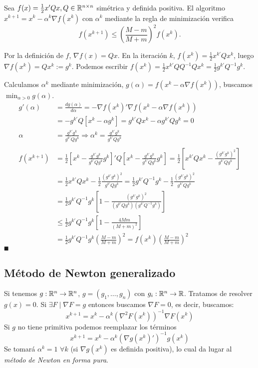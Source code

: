 \documentclass[MIOP.tex]{subfiles}
\begin{document}
\begin{teorema}
Sea $f(x)=\frac{1}{2}x'Qx, Q\in\mathbb{R}^{n\times n}$ simétrica y definida positiva. El algoritmo $x^{k+1}=x^k-\alpha^k\nabla f(x^k)$ con $\alpha^k$ mediante la regla de minimización verifica
$$f(x^{k+1})\leq \left(\frac{M-m}{M+m}\right)^2f(x^k).$$
\end{teorema}
\begin{dem}
Por la definición de $f$, $\nabla f(x)=Qx$. En la iteración $k$, $f(x^k)=\frac{1}{2}x^{k'}Qx^k$, luego $\nabla f(x^k)=Qx^k:=g^k$. Podemos escribir $f(x^k)=\frac{1}{2}x^{k'}QQ^{-1}Qx^k=\frac{1}{2}g^{k'}Q^{-1}g^k$. 

Calculamos $\alpha^k$ mediante minimización, $g(\alpha)=f(x^k-\alpha\nabla f(x^k))$, buscamos $\min_{\alpha>0}g(\alpha)$. 
\begin{align*}
g'(\alpha)&=\frac{dg(\alpha)}{d\alpha}=-\nabla f(x^k)'\nabla f(x^k-\alpha\nabla f(x^k))\\
&=-g^{k'}Q[x^k-\alpha g^k]=g^{k'}Qx^k-\alpha g^{k'}Qg^k=0\\
\alpha&=\frac{g^{k'}g^k}{g^{k'}Qg^k}\Rightarrow \alpha^k=\frac{g^{k'}g^k}{g^{k'}Qg^k}
\\ \\
f(x^{k+1})&=\frac{1}{2}\left[x^k-\frac{g^{k'}g^k}{g^{k'}Qg^k}g^k\right]'Q\left[x^k-\frac{g^{k'}g^k}{g^{k'}Qg^k}g^k\right]=\frac{1}{2}\left[x^{k'}Qx^k-\frac{(g^{k'}g^k)^2}{g^{k'}Qg^k}\right]\\
&=\frac{1}{2}x^{k'}Qx^k-\frac{1}{2}\frac{(g^{k'}g^k)^2}{g^{k'}Qg^k}=\frac{1}{2}g^{k'}Q^{-1}g^k-\frac{1}{2}\frac{(g^{k'}g^k)^2}{g^{k'}Qg^k}\\ 
&=\frac{1}{2}g^{k'}Q^{-1}g^k\left[1-\frac{(g^{k'}g^k)^2}{(g^{k'}Qg^k)(g^{k'}Q^{-1}g^k)}\right]\\
&\leq\frac{1}{2}g^{k'}Q^{-1}g^k\left[1-\frac{4Mm}{(M+m)^2}\right]\\
&=\frac{1}{2}g^{k'}Q^{-1}g^k\left(\frac{M-m}{M+m}\right)^2=f(x^k)\left(\frac{M-m}{M+m}\right)^2
\end{align*}
$\QED$
\end{dem}

\subsection{Método de Newton generalizado}
Si tenemos $g:\mathbb{R}^{n}\to \mathbb{R}^n$, $g=(g_1,\dotsc,g_n)$ con $g_i : \mathbb{R}^n \to \mathbb{R}$. Tratamos de resolver $g(x)=0$. Si $\exists F\mid \nabla F = g$ entonces buscamos $\nabla F =0$, es decir, buscamos:
\[
x^{k+1} =x^k - \alpha^k (\nabla^2 F(x^k))^{-1}\nabla F(x^k)
\]
Si $g$ no tiene primitiva podemos reemplazar los términos 
\[
x^{k+1}=x^k-\alpha^k(\nabla g(x^k)')^{-1} g(x^k)
\]
Se tomará $\alpha^k =1$ $\forall k$ (si $\nabla g(x^k)$ es definida positiva), lo cual da lugar al \emph{método de Newton en forma pura}.
\end{document}
